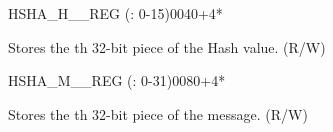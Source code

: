 \begin{register}{H}{SHA\_H\_\_REG (: 0-15)}{\hexprefix{}0040+4*}\label{regdesc:SHAHNREG}
%
\regnewline%
\begin{regdesc}\begin{reglist}
\label{fielddesc:SHAH0}\item [SHA\_H\_\regindex{n}] Stores the th 32-bit piece of the Hash value. (R/W)
\end{reglist}\end{regdesc}
\end{register}

\begin{register}{H}{SHA\_M\_\_REG (: 0-31)}{\hexprefix{}0080+4*}\label{regdesc:SHAMNREG}
%
\regnewline%
\begin{regdesc}\begin{reglist}
\label{fielddesc:SHAM0}\item [SHA\_M\_\regindex{n}] Stores the th 32-bit piece of the message. (R/W)
\end{reglist}\end{regdesc}
\end{register}
